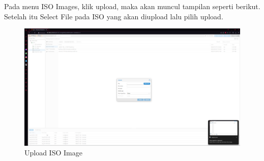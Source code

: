 \documentclass{article}
\begin{document}
  Pada menu ISO Images, klik upload, maka akan muncul tampilan seperti berikut. Setelah itu Select File pada ISO yang akan diupload lalu pilih upload.
  \begin{figure}[h!]
    \centering
    \includegraphics[width=0.7\linewidth]{upload iso 2.png}
    \caption{Upload ISO Image}
  \end{figure}
\end{document}

